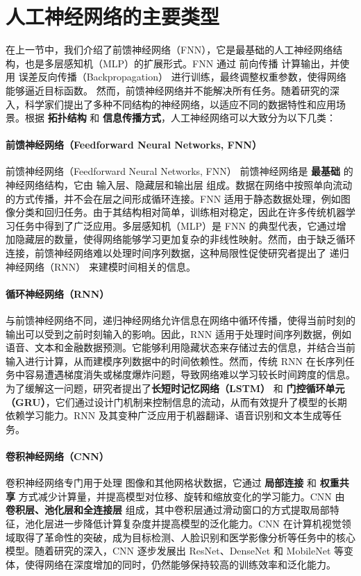 \section{人工神经网络的主要类型}
在上一节中，我们介绍了前馈神经网络（FNN），它是最基础的人工神经网络结构，也是多层感知机（MLP）的扩展形式。FNN 通过 前向传播 计算输出，并使用 误差反向传播（Backpropagation） 进行训练，最终调整权重参数，使得网络能够逼近目标函数。
然而，前馈神经网络并不能解决所有任务。随着研究的深入，科学家们提出了多种不同结构的神经网络，以适应不同的数据特性和应用场景。根据 {\bf 拓扑结构} 和 {\bf 信息传播方式}，人工神经网络可以大致分为以下几类：
\paragraph*{ 前馈神经网络（Feedforward Neural Networks, FNN）}
前馈神经网络（Feedforward Neural Networks, FNN）
前馈神经网络是 {\bf 最基础} 的神经网络结构，它由 输入层、隐藏层和输出层 组成。数据在网络中按照单向流动的方式传播，并不会在层之间形成循环连接。FNN 适用于静态数据处理，例如图像分类和回归任务。由于其结构相对简单，训练相对稳定，因此在许多传统机器学习任务中得到了广泛应用。多层感知机（MLP）是 FNN 的典型代表，它通过增加隐藏层的数量，使得网络能够学习更加复杂的非线性映射。然而，由于缺乏循环连接，前馈神经网络难以处理时间序列数据，这种局限性促使研究者提出了 递归神经网络（RNN） 来建模时间相关的信息。
\paragraph*{ 循环神经网络（RNN）}
与前馈神经网络不同，递归神经网络允许信息在网络中循环传播，使得当前时刻的输出可以受到之前时刻输入的影响。因此，RNN 适用于处理时间序列数据，例如语音、文本和金融数据预测。它能够利用隐藏状态来存储过去的信息，并结合当前输入进行计算，从而建模序列数据中的时间依赖性。然而，传统 RNN 在长序列任务中容易遭遇梯度消失或梯度爆炸问题，导致网络难以学习较长时间跨度的信息。为了缓解这一问题，研究者提出了{\bf  长短时记忆网络（LSTM）} 和 {\bf 门控循环单元（GRU）}，它们通过设计门机制来控制信息的流动，从而有效提升了模型的长期依赖学习能力。RNN 及其变种广泛应用于机器翻译、语音识别和文本生成等任务。
\paragraph*{ 卷积神经网络（CNN）}
卷积神经网络专门用于处理 图像和其他网格状数据，它通过 {\bf 局部连接} 和 {\bf 权重共享} 方式减少计算量，并提高模型对位移、旋转和缩放变化的学习能力。CNN 由 {\bf 卷积层、池化层和全连接层} 组成，其中卷积层通过滑动窗口的方式提取局部特征，池化层进一步降低计算复杂度并提高模型的泛化能力。CNN 在计算机视觉领域取得了革命性的突破，成为目标检测、人脸识别和医学影像分析等任务中的核心模型。随着研究的深入，CNN 逐步发展出 ResNet、DenseNet 和 MobileNet 等变体，使得网络在深度增加的同时，仍然能够保持较高的训练效率和泛化能力。
